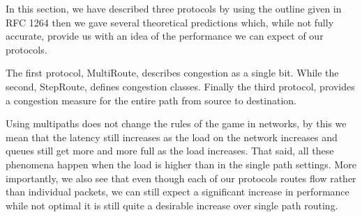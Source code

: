 

In this section, we have described three protocols by using the outline given in RFC 1264 \cite{RFC1264} then we gave several theoretical predictions which, while not fully accurate, provide us with an idea  of the performance we can expect of our protocols. 

The first protocol, MultiRoute, describes congestion as a single bit. While the second, StepRoute, defines congestion classes. Finally the third protocol, provides a congestion measure for the entire path from source to destination.

Using multipaths does not change the rules of the game in networks, by this we mean that the latency still increases as the load on the network increases and queues still get more and more full as the load increases. That said, all these phenomena happen when the load is higher than in the single path settings. More importantly, we also see that even though each of our protocols routes flow rather than individual packets, we can still expect a significant increase in performance while not optimal it is still quite a desirable increase over single path routing.  




